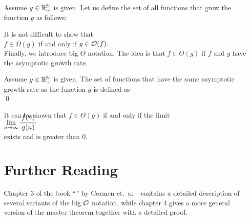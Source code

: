 \begin{Definition}[$\Omega(g)$] 
  Assume $g \in {\mathbb R}_+^{{\mathbb N}}$ is given.   Let us define the set of all functions that grow 
   the function $g$ as follows:
  \\[0.2cm]
  \hspace*{0.5cm} 
  \colorbox{red}{}
  \eox
\end{Definition}
It is not difficult to show that
\\[0.2cm]
\hspace*{1.3cm}
 $f \in \Omega(g)$ \quad if and only if \quad $g \in \mathcal{O}(f)$.
\\[0.2cm]
Finally, we introduce big $\Theta$ notation.  The idea is that $f \in \Theta(g)$ if 
$f$ and $g$ have the  asymptotic growth rate. 

\begin{Definition}[$\Theta(g)$] 
  Assume $g \in {\mathbb R}_+^{{\mathbb N}}$ is given.   The set of functions that have the same asymptotic growth rate
  as the function $g$ is defined as
  \\[0.2cm]
  \hspace*{0.5cm} 
  \colorbox{red}{}
  \qed 
\end{Definition}

\noindent
It can be shown that $f \in \Theta(g)$ if and only if the limit
\\[0.4cm]
\hspace*{1.3cm}
$\lim\limits_{n \rightarrow \infty} \bruch{f(n)}{g(n)}$
\\[0.2cm]
exists and is greater than $0$.


\section{Further Reading}
Chapter 3 of the book ``'' by Cormen et.~al.~\cite{cormen:09}
contains a detailed description of several variants of the big $\mathcal{O}$ notation, while
chapter 4 gives a more general version of the master theorem together with a detailed proof.
\pagebreak


